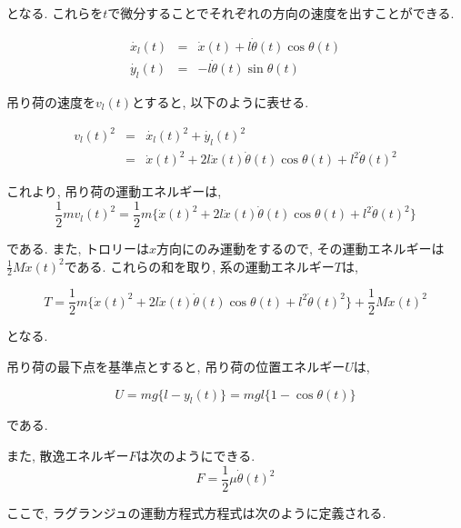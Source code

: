 \documentclass[titlepage]{jsarticle}
\begin{document}
        となる. これらを$t$で微分することでそれぞれの方向の速度を出すことができる.
        
        \begin{eqnarray*}
            \dot{x_l}(t) &=& \dot{x}(t) + l\dot{\theta}(t)\cos{\theta(t)} \\
            \dot{y_l}(t) &=& -l\dot{\theta}(t)\sin{\theta(t)}
        \end{eqnarray*}

        吊り荷の速度を$v_l(t)$とすると, 以下のように表せる.

        \begin{eqnarray*}
            v_l(t)^2 &=& \dot{x_l}(t)^2 + \dot{y_l}(t)^2 \nonumber \\
            &=& \dot{x}(t)^2 + 2 l \dot{x}(t)\dot{\theta}(t)\cos{\theta(t)} + l^2 \dot{\theta}(t)^2
        \end{eqnarray*}

        これより, 吊り荷の運動エネルギーは,
        \[
            \frac{1}{2}mv_l(t)^2 = \frac{1}{2}m\{\dot{x}(t)^2 + 2 l \dot{x}(t)\dot{\theta}(t)\cos{\theta(t)} + l^2 \dot{\theta}(t)^2\}
        \]
        
        である. また, トロリーは$x$方向にのみ運動をするので,
        その運動エネルギーは$\displaystyle \frac{1}{2}M\dot{x}(t)^2$である.
        これらの和を取り, 系の運動エネルギー$T$は,

        \begin{equation}
            T = \frac{1}{2} m \{\dot{x}(t)^2 + 2 l \dot{x}(t)\dot{\theta}(t)\cos{\theta(t)} + l^2 \dot{\theta}(t)^2\} + \frac{1}{2}M\dot{x}(t)^2 \label{equ:t}
        \end{equation}

        となる.
        
        吊り荷の最下点を基準点とすると, 吊り荷の位置エネルギー$U$は,

        \begin{equation}
            U = mg\{l-y_l(t)\} = mgl\{1-\cos{\theta(t)}\} \label{equ:u}
        \end{equation}

        である.
        
        また, 散逸エネルギー$F$は次のようにできる.
        \begin{equation}
            F = \frac{1}{2} \mu \dot{\theta}(t)^2 \label{equ:f}
        \end{equation}

        ここで, ラグランジュの運動方程式方程式は次のように定義される.
    
\end{document}
